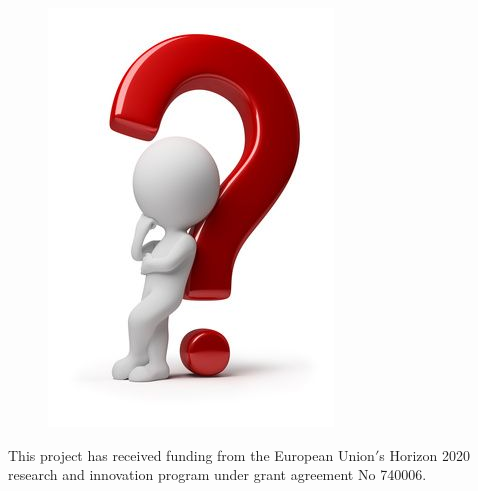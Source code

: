 \documentclass[aspectratio=43]{beamer}
\begin{document}
\begin{frame}


	\begin{figure}
		\includegraphics[width = 3 cm]{plots/final/thinking.png}
	\end{figure}		

	{\small \color{blue} \footnotesize This project has received funding from the European Union$'$s Horizon 2020 research and innovation program under grant agreement No 740006.}

\end{frame}
\end{document}
